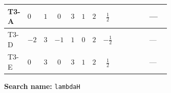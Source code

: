 \documentclass[8pt]{article}
\begin{document}
\begin{landscape}
\begin{longtable}{@{}llcccccc >{\raggedright\arraybackslash}p{0.21\linewidth} >{\raggedright\arraybackslash}p{0.21\linewidth} >{\raggedright\arraybackslash}p{0.21\linewidth}@{}}
\midrule
T3-A & $0$ & $1$ & $0$ & $3$ & $1$ & $2$ & $\frac{1}{2}$ & \scriptsize\adjustbox{max width=\linewidth}{$\begin{gathered} +12 {\lambda_H}^2\end{gathered}$} & \scriptsize\adjustbox{max width=\linewidth}{$\begin{gathered} +2 {\lambda_{H1}}^2\end{gathered}$} & --- \\
\midrule
T3-D & $-2$ & $3$ & $-1$ & $1$ & $0$ & $2$ & $-\frac{1}{2}$ & \scriptsize\adjustbox{max width=\linewidth}{$\begin{gathered} +12 {\lambda_H}^2\end{gathered}$} & \scriptsize\adjustbox{max width=\linewidth}{$\begin{gathered} +6 {\lambda_{H1}}^2\end{gathered}$} & --- \\
\midrule
T3-E & $0$ & $3$ & $0$ & $3$ & $1$ & $2$ & $\frac{1}{2}$ & \scriptsize\adjustbox{max width=\linewidth}{$\begin{gathered} +12 {\lambda_H}^2\end{gathered}$} & \scriptsize\adjustbox{max width=\linewidth}{$\begin{gathered} +6 {\lambda_{H1}}^2\end{gathered}$} & --- \\
\midrule
\bottomrule
\end{longtable}
\clearpage
\noindent\textbf{Search name: }\texttt{lambdaH}\par\smallskip

\end{landscape}
\end{document}
